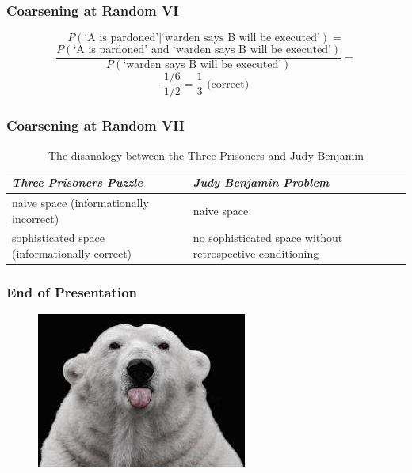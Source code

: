 \documentclass[xcolor=dvipsnames]{beamer}
\begin{document}
\begin{frame}
  \frametitle{Coarsening at Random VI}
\begin{displaymath}
  P(\mbox{`A is pardoned'}|\mbox{`warden says B will be
    executed'})=
\end{displaymath}
\begin{displaymath}
  \frac{P(\mbox{`A is pardoned' and `warden says B will
      be executed'})}{P(\mbox{`warden says B will be
      executed'})}=
\end{displaymath}
\begin{displaymath}
  \frac{1/6}{1/2}=\frac{1}{3}\mbox{ (correct)}
\end{displaymath}
\end{frame}

\renewcommand{\arraystretch}{4}
\begin{frame}
  \frametitle{Coarsening at Random VII}
  \begin{table}
    \centering
    \begin{tabular}{|l|l|}\hline
    \rowcolor{myblue} \emph{Three Prisoners Puzzle} & \emph{Judy Benjamin Problem} \\ \hline
\parbox{3.5cm}{\raggedright naive space (informationally incorrect)} & \parbox{3.5cm}{\raggedright naive space} \\ \hline
\parbox{3.5cm}{\raggedright sophisticated space (informationally correct)} & \parbox{3.5cm}{\raggedright no sophisticated space without retrospective conditioning} \\ \hline
  \end{tabular}
    \caption{The disanalogy between the Three Prisoners and Judy Benjamin}
  \end{table}
\end{frame}

\begin{frame}
  \frametitle{End of Presentation}
  \begin{figure}[h]
    \includegraphics[scale=.4]{../diagrams/images.jpg}
  \end{figure}
\end{frame}
\end{document}
